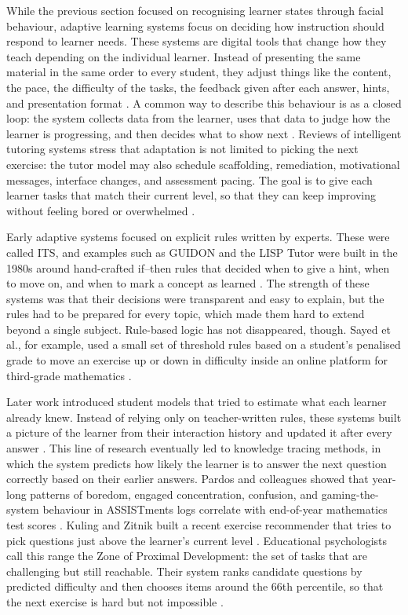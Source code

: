 While the previous section focused on recognising learner states through facial behaviour, adaptive learning systems focus on deciding how instruction should respond to learner needs. These systems are digital tools that change how they teach depending on the individual learner. Instead of presenting the same material in the same order to every student, they adjust things like the content, the pace, the difficulty of the tasks, the feedback given after each answer, hints, and presentation format \cite{strielkowski_span_2025}. A common way to describe this behaviour is as a closed loop: the system collects data from the learner, uses that data to judge how the learner is progressing, and then decides what to show next \cite{gligorea_adaptive_2023}. Reviews of intelligent tutoring systems stress that adaptation is not limited to picking the next exercise: the tutor model may also schedule scaffolding, remediation, motivational messages, interface changes, and assessment pacing. The goal is to give each learner tasks that match their current level, so that they can keep improving without feeling bored or overwhelmed \cite{zerkouk_comprehensive_2025}.

Early adaptive systems focused on explicit rules written by experts. These were called \ac{ITS}, and examples such as GUIDON and the LISP Tutor were built in the 1980s around hand-crafted if--then rules that decided when to give a hint, when to move on, and when to mark a concept as learned . The strength of these systems was that their decisions were transparent and easy to explain, but the rules had to be prepared for every topic, which made them hard to extend beyond a single subject. Rule-based logic has not disappeared, though. Sayed et al., for example, used a small set of threshold rules based on a student's penalised grade to move an exercise up or down in difficulty inside an online platform for third-grade mathematics \cite{sayed_ai-based_2023}.

Later work introduced student models that tried to estimate what each learner already knew. Instead of relying only on teacher-written rules, these systems built a picture of the learner from their interaction history and updated it after every answer \cite{zerkouk_comprehensive_2025}. This line of research eventually led to knowledge tracing methods, in which the system predicts how likely the learner is to answer the next question correctly based on their earlier answers. Pardos and colleagues showed that year-long patterns of boredom, engaged concentration, confusion, and gaming-the-system behaviour in ASSISTments logs correlate with end-of-year mathematics test scores \cite{Pardos2014AffectiveStatesStateTests}. Kuling and Zitnik built a recent exercise recommender that tries to pick questions just above the learner's current level \cite{kuling_ken_2025}. Educational psychologists call this range the Zone of Proximal Development: the set of tasks that are challenging but still reachable. Their system ranks candidate questions by predicted difficulty and then chooses items around the 66th percentile, so that the next exercise is hard but not impossible \cite{kuling_ken_2025}.


